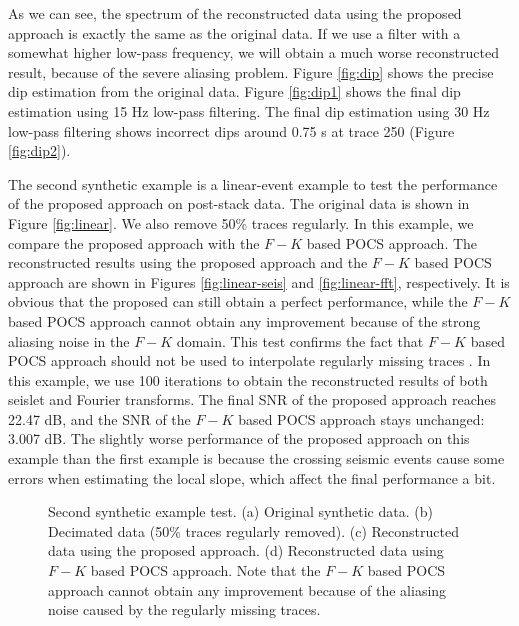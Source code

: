 As we can see, the spectrum of the reconstructed data using the proposed approach is exactly the same as the original data. If we use a filter with a somewhat higher low-pass frequency, we will obtain a much worse reconstructed result, because of the severe aliasing problem. Figure \ref{fig:dip} shows the precise dip estimation from the original data. Figure \ref{fig:dip1} shows the final dip estimation using 15 Hz low-pass filtering. The final dip estimation using 30 Hz low-pass filtering shows incorrect dips around 0.75 s at trace 250 (Figure \ref{fig:dip2}). 

The second synthetic example is a linear-event example to test the performance of the proposed approach on post-stack data. The original data is shown in Figure \ref{fig:linear}. We also remove 50\% traces regularly. In this example, we compare the proposed approach with the $F-K$ based POCS approach. The reconstructed results using the proposed approach and the $F-K$ based POCS approach are shown in Figures \ref{fig:linear-seis} and \ref{fig:linear-fft}, respectively. It is obvious that the proposed can still obtain a perfect performance, while the $F-K$ based POCS approach cannot obtain any improvement because of the strong aliasing noise in the $F-K$ domain. This test confirms the fact that $F-K$ based POCS approach should not be used to interpolate regularly missing traces \cite{spitz1991,mostafa2007,mostafa2010}. In this example, we use 100 iterations to obtain the reconstructed results of both seislet and Fourier transforms. The final SNR of the proposed approach reaches 22.47 dB, and the SNR of the $F-K$ based POCS approach stays unchanged: 3.007 dB. The slightly worse performance of the proposed approach on this example than the first example is because the crossing seismic events cause some errors when estimating the local slope, which affect the final performance a bit.  

\begin{figure}[htb!]
  \centering
	\caption{Second synthetic example test. (a) Original synthetic data. (b) Decimated data (50\% traces regularly removed). (c) Reconstructed data using the proposed approach. (d) Reconstructed data using $F-K$ based POCS approach. Note that the $F-K$ based POCS approach cannot obtain any improvement because of the aliasing noise caused by the regularly missing traces.}
   \label{fig:linear,linear-zero,linear-seis,linear-fft}
\end{figure}

